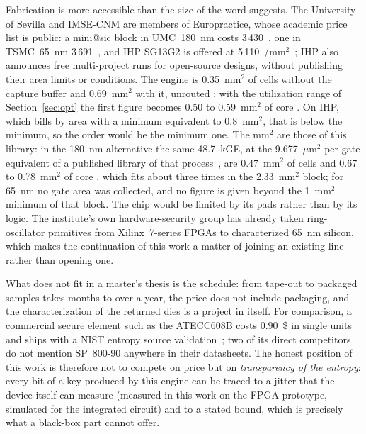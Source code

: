 Fabrication is more accessible than the size of the word suggests. The
University of Sevilla and IMSE-CNM are members of Europractice, whose
academic price list is public: a mini@sic block in UMC~180~nm costs
3\,430~\texteuro{}, one in TSMC~65~nm 3\,691~\texteuro{}, and IHP SG13G2 is
offered at 5\,110~\texteuro{}/mm$^2$~\cite{europractice_prices2026}; IHP
also announces free multi-project runs for open-source designs, without
publishing their area limits or conditions. The
engine is 0.35~mm$^2$ of cells without the capture buffer and
0.69~mm$^2$ with it, unrouted \simu{}; with the utilization range of
Section~\ref{sec:opt} the first figure becomes 0.50 to 0.59~mm$^2$ of
core \est{}. On IHP, which bills by area with a minimum equivalent to
0.8~mm$^2$, that is below the minimum, so the order would be the minimum
one. The mm$^2$ are those of this library: in the 180~nm alternative
the same 48.7~kGE, at the 9.677~$\mu\mathrm{m}^2$ per gate equivalent of
a published library of that
process~\cite{poschmann2009lightweight}, are 0.47~mm$^2$ of cells and
0.67 to 0.78~mm$^2$ of core \est{}, which fits about three times in the
2.33~mm$^2$ block; for 65~nm no gate area was collected, and no figure
is given beyond the 1~mm$^2$ minimum of that block. The chip would be
limited by its pads rather than by its logic. The
institute's own hardware-security group has already taken ring-oscillator
primitives from Xilinx~7-series FPGAs to characterized 65~nm silicon,
which makes the continuation of this work a matter of joining an
existing line rather than opening one.

What does not fit in a master's thesis is the schedule: from tape-out to
packaged samples takes months to over a year, the price does not include
packaging, and the characterization of the returned dies is a project in
itself. For comparison, a commercial secure element such as the
ATECC608B costs 0.90~\$ in single units and ships with a NIST entropy
source validation~\cite{microchip_atecc608b_ds}; two of its direct competitors
do not mention SP~800-90 anywhere in their datasheets. The honest
position of this work is therefore not to compete on price but on
\emph{transparency of the entropy}: every bit of a key produced by this
engine can be traced to a jitter that the device itself can measure
(measured in this work on the \ac{FPGA} prototype, simulated for the
integrated circuit) and to a stated bound, which is
precisely what a black-box part cannot offer.
